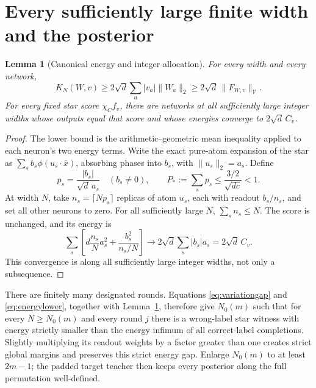 \documentclass[11pt]{article}
\newtheorem{lemma}[theorem]{Lemma}
\newcommand{\cV}{\mathcal V}
\begin{document}
\section{Every sufficiently large finite width and the posterior}

\begin{lemma}[Canonical energy and integer allocation]\label{lem:allocation}
For every width and every network,
\begin{equation}\label{eq:energylower}
 K_N(W,v)\ge2\sqrt d\sum_a |v_a|\|W_a\|_2
            \ge2\sqrt d\,\|F_{W,v}\|_{\cV}.
\end{equation}
For every fixed star score $\chi_C f_v$, there are networks at all
sufficiently large integer widths whose outputs equal that score and
whose energies converge to $2\sqrt d\,C_v$.
\end{lemma}
\begin{proof}
The lower bound is the arithmetic--geometric mean inequality applied
to each neuron's two energy terms. Write the exact pure-atom expansion
of the star as $\sum_s b_s\phi(u_s\cdot\bar x)$, absorbing phases into
$b_s$, with $\|u_s\|_2=a_s$. Define
\[
 p_s=\frac{|b_s|}{\sqrt d\,a_s}\quad(b_s\ne0),\qquad
 P_*:=\sum_s p_s\le\frac{3/2}{\sqrt{dc}}<1.
\]
At width $N$, take $n_s=\lceil Np_s\rceil$ replicas of atom $u_s$,
each with readout $b_s/n_s$, and set all other neurons to zero.
For all sufficiently large $N$, $\sum_s n_s\le N$. The score is
unchanged, and its energy is
\[
 \sum_s\left[d\frac{n_s}{N}a_s^2
                 +\frac{b_s^2}{n_s/N}\right]
 \longrightarrow2\sqrt d\sum_s|b_s|a_s=2\sqrt d\,C_v.
\]
This convergence is along all sufficiently large integer widths, not
only a subsequence.
\end{proof}

There are finitely many designated rounds. Equations
\eqref{eq:variationgap} and \eqref{eq:energylower}, together with
Lemma~\ref{lem:allocation}, therefore give $N_0(m)$ such that for
every $N\ge N_0(m)$ and every round $j$ there is a wrong-label star
witness with energy strictly smaller than the energy infimum of all
correct-label completions. Slightly multiplying its readout weights
by a factor greater than one creates strict global margins and
preserves this strict energy gap.
Enlarge $N_0(m)$ to at least $2m-1$; the padded target teacher then
keeps every posterior along the full permutation well-defined.
\end{document}
